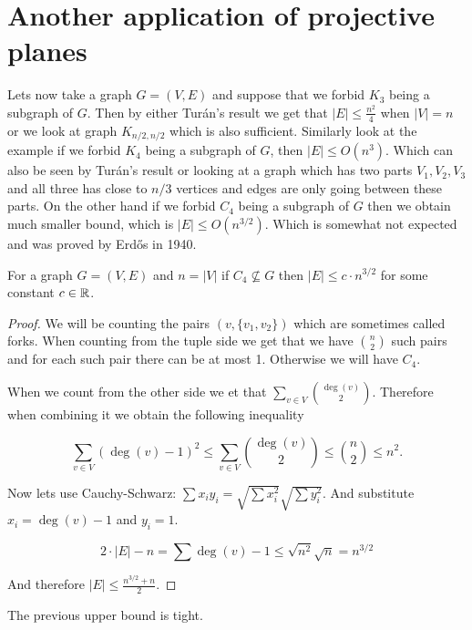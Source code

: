 \section{Another application of projective planes}

Lets now take a graph $G = (V,E)$ and suppose that we forbid $K_3$ being a subgraph of $G$. Then by either Turán's result we get that $|E| \leq \frac{n^2}{4}$ when $|V| = n$ or we look at graph $K_{n/2,n/2}$ which is also sufficient. Similarly look at the example if we forbid $K_4$ being a subgraph of $G$, then $|E| \leq O(n^3)$. Which can also be seen by Turán's result or looking at a graph which has two parts $V_1, V_2, V_3$ and all three has close to $n/3$ vertices and edges are only going between these parts. On the other hand if we forbid $C_4$ being a subgraph of $G$ then we obtain much smaller bound, which is $|E| \leq O(n^{3/2})$. Which is somewhat not expected and was proved by Erd\H os in 1940.

\begin{prop}
	For a graph $G = (V,E)$ and $n = |V|$ if $C_4 \not\subseteq G$ then $|E| \leq c \cdot n^{3/2}$ for some constant $c \in \mathbb{R}$.
\end{prop}

\begin{proof}
	We will be counting the pairs $(v, \{v_1,v_2\})$ which are sometimes called forks. When counting from the tuple side we get that we have $\binom{n}{2}$ such pairs and for each such pair there can be at most 1. Otherwise we will have $C_4$.
	
	When we count from the other side we et that $\sum_{v \in V} \binom{\deg(v)}{2}$. Therefore when combining it we obtain the following inequality
	
	$$
	\sum_{v \in V} (\deg(v) -1)^2 \leq \sum_{v \in V} \binom{\deg(v)}{2} \leq \binom{n}{2} \leq n^2.
	$$
	
	Now lets use Cauchy-Schwarz: $\sum x_i y_i = \sqrt{\sum x_i^2} \sqrt{\sum y_i^2}$. And substitute $x_i = \deg(v) -1$ and $y_i = 1$.
	
	$$
	2 \cdot |E| - n = \sum \deg(v) - 1 \leq \sqrt{n^2} \sqrt{n} = n^{3/2}
	$$
	
	And therefore $|E| \leq \frac{n^{3/2} + n}{2}$.
\end{proof}

\begin{prop}
	The previous upper bound is tight.
\end{prop}

